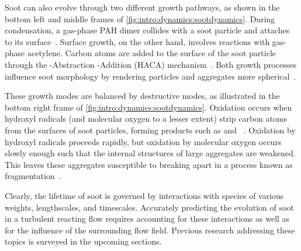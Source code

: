 Soot can also evolve through two different growth pathways, as shown in the bottom left and middle frames of \cref{fig:intro:dynamics:sootdynamics}. During condensation, a gas-phase PAH dimer collides with a soot particle and attaches to its surface~\cite{hmom2009,blanquart2009}. Surface growth, on the other hand, involves reactions with gas-phase acetylene. Carbon atoms are added to the surface of the soot particle through the -Abstraction -Addition (HACA) mechanism~\cite{frenklach1985,frenklach1991}. Both growth processes influence soot morphology by rendering particles and aggregates more spherical~\cite{mitchell1998,mitchell2003,park2003}.

These growth modes are balanced by destructive modes, as illustrated in the bottom right frame of \cref{fig:intro:dynamics:sootdynamics}. Oxidation occurs when hydroxyl radicals (and molecular oxygen to a lesser extent) strip carbon atoms from the surfaces of soot particles, forming products such as  and ~\cite{kazakov1995,neoh1981,stanmore2001}. Oxidation by hydroxyl radicals proceeds rapidly, but oxidation by molecular oxygen occurs slowly enough such that the internal structures of large aggregates are weakened. This leaves these aggregates susceptible to breaking apart in a process known as fragmentation~\cite{mueller2011,neoh1985}.

Clearly, the lifetime of soot is governed by interactions with species of various weights, lengthscales, and timescales. Accurately predicting the evolution of soot in a turbulent reacting flow requires accounting for these interactions as well as for the influence of the surrounding flow field. Previous research addressing these topics is surveyed in the upcoming sections.
